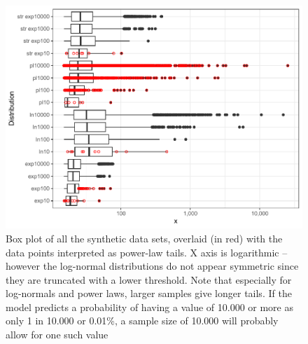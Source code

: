 \documentclass[
  12pt,
  a4paper, twoside]{book}
\begin{document}
\begin{figure}

{\centering \includegraphics[width=0.9\linewidth]{bookdown-demo_files/figure-latex/05-pltails-1} 

}

\caption[Power-law tails and sample size]{Box plot of all the synthetic data sets, overlaid (in red) with the data points interpreted as power-law tails. X axis is logarithmic -- however the log-normal distributions do not appear symmetric since they are truncated with a lower threshold. Note that especially for log-normals and power laws, larger samples give longer tails. If the model predicts a probability of having a value of 10.000 or more as only 1 in 10.000 or 0.01\%, a sample size of 10.000 will probably allow for one such value}\label{fig:05-pltails}
\end{figure}

\FloatBarrier
\end{document}
